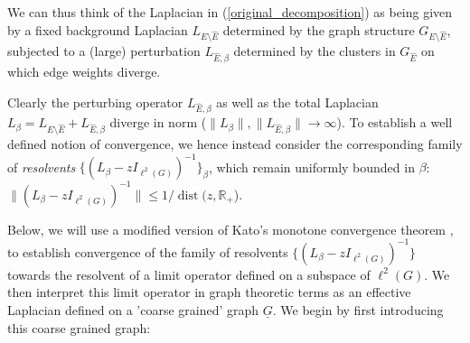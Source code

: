 \documentclass[reqno,12pt,letterpaper]{amsart}
\numberwithin{equation}{section}
\newcommand{\IG}{I_{\ell^2(G)}}
\newcommand{\dist}{{\operatorname{dist}}}
\newcommand{\1}{\mathds{1}}
\theoremstyle{definition}
\begin{document}
We can thus think of the Laplacian in (\ref{original_decomposition}) as being given by a fixed background Laplacian $L_{E \setminus \hat{E}}$ determined by the graph structure $G_{E \setminus \hat{E}}$,
subjected to a (large) perturbation $L_{\hat{E}, \beta}$ determined by the clusters in $G_{\hat{E}}$ on which edge weights diverge.






\medskip

Clearly the perturbing operator $L_{\hat{E},\beta}$ as well as the total Laplacian $L_\beta = L_{E \setminus \hat{E}} +  L_{\hat{E},\beta}$ diverge in norm ($\|L_\beta\|, \|L_{\hat{E},\beta}\| \rightarrow \infty$). To establish a well defined notion of convergence, we hence instead consider the corresponding family of \emph{resolvents} $\{(L_\beta - z \IG)^{-1}\}_{\beta}$, which remain uniformly bounded in $\beta$: $
	\|(L_\beta - z \IG)^{-1}\| \leq 1/\dist(z, \mathds{R}_+
$).















\medskip




Below, we will use a modified version of Kato's monotone convergence theorem 	\cite{kato1995perturbation,simon1978canonical}, to establish convergence of the family of resolvents $\{(L_\beta - z \IG)^{-1}\}$ towards the resolvent of a limit operator defined on a subspace of $\ell^2(G)$. We then interpret this limit operator in graph theoretic terms as an effective Laplacian defined on a 'coarse grained' graph $\underline{G}$. We begin by first introducing this coarse grained graph:
\end{document}
